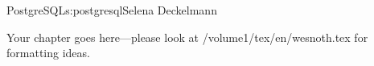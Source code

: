 \begin{aosachapter}{PostgreSQL}{s:postgresql}{Selena Deckelmann}

Your chapter goes here---please look at /volume1/tex/en/wesnoth.tex for 
formatting ideas.

\end{aosachapter}
